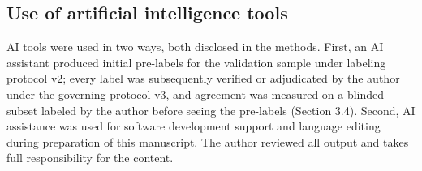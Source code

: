 \documentclass[pdflatex,sn-basic]{sn-jnl}
\begin{document}
\subsection*{Use of artificial intelligence tools}
AI tools were used in two ways, both disclosed in the methods. First, an AI
assistant produced initial pre-labels for the validation sample under
labeling protocol v2; every label was subsequently verified or adjudicated
by the author under the governing protocol v3, and agreement was measured
on a blinded subset labeled by the author before seeing the pre-labels
(Section 3.4). Second, AI assistance was used for software development
support and language editing during preparation of this manuscript. The
author reviewed all output and takes full responsibility for the content.

\nocite{CISBenchmark,NSA2022,K8sPSS,ToolDocs}

\end{document}
